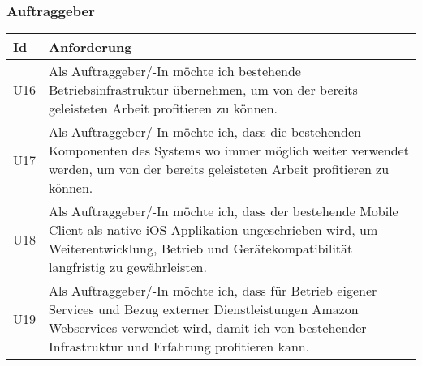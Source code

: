 \subsubsection{Auftraggeber}

\begin{table}[h]
    \centering
    \begin{tabular}{|l|p{15cm}|}
        \hline
        \textbf{Id} & \textbf{Anforderung}                                                                                                                                                                          \\
        \hline
        U16         & Als Auftraggeber/-In möchte ich bestehende Betriebsinfrastruktur übernehmen, um von der bereits geleisteten Arbeit profitieren zu können.                                                     \\
        \hline
        U17         & Als Auftraggeber/-In möchte ich, dass die bestehenden Komponenten des Systems wo immer möglich weiter verwendet werden, um von der bereits geleisteten Arbeit profitieren zu können.               \\
        \hline
        U18         & Als Auftraggeber/-In möchte ich, dass der bestehende Mobile Client als native iOS Applikation ungeschrieben wird, um Weiterentwicklung, Betrieb und Gerätekompatibilität langfristig zu gewährleisten.                            \\
        \hline
        U19         & Als Auftraggeber/-In möchte ich, dass für Betrieb eigener Services und Bezug externer Dienstleistungen Amazon Webservices verwendet wird, damit ich von bestehender Infrastruktur und Erfahrung profitieren kann. \\
        \hline
    \end{tabular}\label{tab:userstories3}
\end{table}

